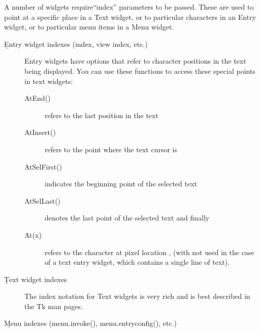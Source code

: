 A number of widgets require``index'' parameters to be passed.  These
are used to point at a specific place in a Text widget, or to
particular characters in an Entry widget, or to particular menu items
in a Menu widget.

\begin{description}
\item[\b{Entry widget indexes (index, view index, etc.)}]
Entry widgets have options that refer to character positions in the
text being displayed.  You can use these  functions
to access these special points in text widgets:

\begin{description}
\item[AtEnd()]
refers to the last position in the text

\item[AtInsert()]
refers to the point where the text cursor is

\item[AtSelFirst()]
indicates the beginning point of the selected text

\item[AtSelLast()]
denotes the last point of the selected text and finally

\item[At(x)]
refers to the character at pixel location ,  (with
 not used in the case of a text entry widget, which contains a
single line of text).
\end{description}

\item[\b{Text widget indexes}]
The index notation for Text widgets is very rich and is best described
in the Tk man pages.

\item[\b{Menu indexes (menu.invoke(), menu.entryconfig(), etc.)}]


\end{description}
